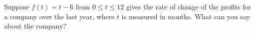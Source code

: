 \documentclass{ximera}
\begin{document}
\begin{problem}

  Suppose $f(t) = t-6$ from $0 \leq t \leq 12$ gives the rate of
  change of the profits for a company over the last year, where $t$ is
  measured in months.  What can you say about the company?
  \begin{multipleChoice}
  \end{multipleChoice}
\end{problem}
\end{document}
